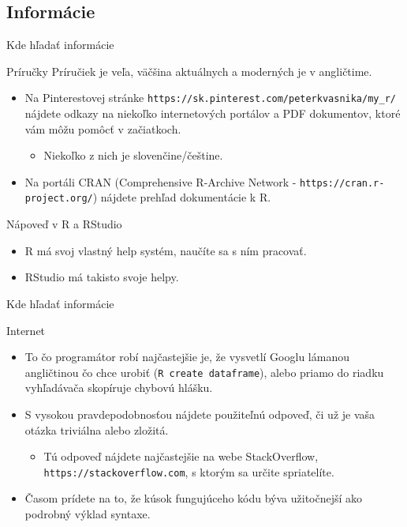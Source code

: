 \subsection{Informácie}
\begin{frame}{Kde hľadať informácie}
	\begin{block}{Príručky}
		Príručiek je veľa, väčšina aktuálnych a moderných je v angličtime.
		\begin{itemize}
			\item Na Pinterestovej stránke \texttt{https://sk.pinterest.com/peterkvasnika/my\_r/} nájdete odkazy na niekoľko internetových portálov a PDF dokumentov, ktoré vám môžu pomôcť v začiatkoch.
			\begin{itemize}
				\item Niekoľko z nich je slovenčine/češtine.
			\end{itemize}
			\item Na portáli CRAN (Comprehensive R-Archive Network - \texttt{https://cran.r-project.org/}) nájdete prehľad dokumentácie k R.
		\end{itemize}
	\end{block}
	\begin{block}{Nápoveď v R a RStudio}
		\begin{itemize}
			\item R má svoj vlastný help systém, naučíte sa s ním pracovať.
			\item RStudio má takisto svoje helpy.
		\end{itemize}
	\end{block}
\end{frame}

\begin{frame}{Kde hľadať informácie}
	\begin{block}{Internet}
		\begin{itemize}
			\item To čo programátor robí najčastejšie je, že vysvetlí Googlu lámanou angličtinou čo chce urobiť (\texttt{R create dataframe}), alebo priamo do riadku vyhľadávača skopíruje chybovú hlášku. 
			\item S vysokou pravdepodobnosťou nájdete použiteľnú odpoveď, či už je vaša otázka triviálna alebo zložitá.
			\begin{itemize}
				\item Tú odpoveď nájdete najčastejšie na webe StackOverflow, \texttt{https://stackoverflow.com}, s ktorým sa určite spriatelíte.
			\end{itemize}
			\item Časom prídete na to, že kúsok fungujúceho kódu býva užitočnejší ako podrobný výklad syntaxe. 
		\end{itemize}
	\end{block}
\end{frame}

